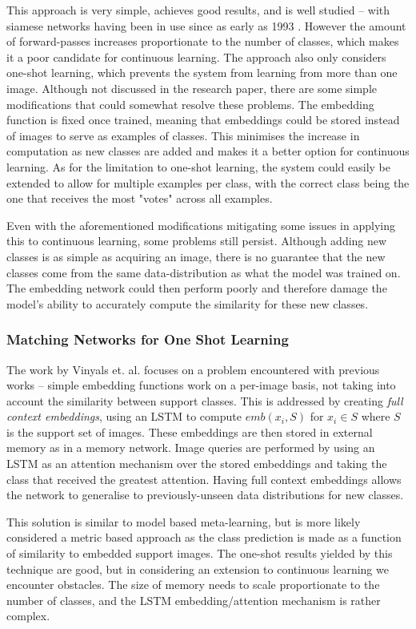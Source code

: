 \documentclass{report}
\begin{document}
This approach is very simple, achieves good results, and is well studied -- with siamese networks having been in use since as early as 1993 \parencite{earlysiamese}. However the amount of forward-passes increases proportionate to the number of classes, which makes it a poor candidate for continuous learning. The approach also only considers one-shot learning, which prevents the system from learning from more than one image. Although not discussed in the research paper, there are some simple modifications that could somewhat resolve these problems. The embedding function is fixed once trained, meaning that embeddings could be stored instead of images to serve as examples of classes. This minimises the increase in computation as new classes are added and makes it a better option for continuous learning. As for the limitation to one-shot learning, the system could easily be extended to allow for multiple examples per class, with the correct class being the one that receives the most "votes" across all examples. \par
Even with the aforementioned modifications mitigating some issues in applying this to continuous learning, some problems still persist. Although adding new classes is as simple as acquiring an image, there is no guarantee that the new classes come from the same data-distribution as what the model was trained on. The embedding network could then perform poorly and therefore damage the model's ability to accurately compute the similarity for these new classes. \par

\subsubsection{Matching Networks for One Shot Learning}
The work by Vinyals et. al. \parencite{matching} focuses on a problem encountered with previous works -- simple embedding functions work on a per-image basis, not taking into account the similarity between support classes. This is addressed by creating \emph{full context embeddings}, using an LSTM to compute $emb(x_i,S)$ for $x_i \in S$ where $S$ is the support set of images. These embeddings are then stored in external memory as in a memory network. Image queries are performed by using an LSTM as an attention mechanism over the stored embeddings and taking the class that received the greatest attention. Having full context embeddings allows the network to generalise to previously-unseen data distributions for new classes. \par
This solution is similar to model based meta-learning, but is more likely considered a metric based approach as the class prediction is made as a function of similarity to embedded support images. The one-shot results yielded by this technique are good, but in considering an extension to continuous learning we encounter obstacles. The size of memory needs to scale proportionate to the number of classes, and the LSTM embedding/attention mechanism is rather complex. \par
\end{document}

